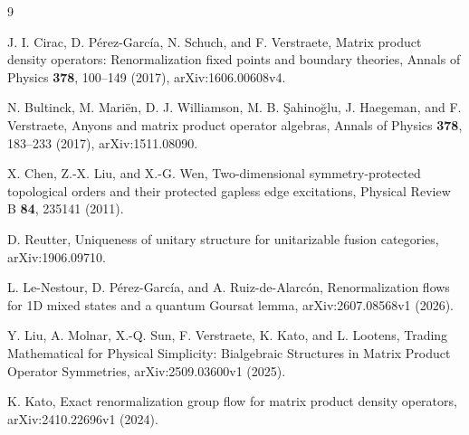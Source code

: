 \begin{thebibliography}{9}

	J. I. Cirac, D. P\'erez-Garc\'ia, N. Schuch, and F. Verstraete,
	Matrix product density operators: Renormalization fixed points and
	boundary theories,
	Annals of Physics \textbf{378}, 100--149 (2017),
	arXiv:1606.00608v4.

	N. Bultinck, M. Mari\"en, D. J. Williamson, M. B. \c{S}ahino\u{g}lu,
	J. Haegeman, and F. Verstraete,
	Anyons and matrix product operator algebras,
	Annals of Physics \textbf{378}, 183--233 (2017),
	arXiv:1511.08090.

	X. Chen, Z.-X. Liu, and X.-G. Wen,
	Two-dimensional symmetry-protected topological orders and their
	protected gapless edge excitations,
	Physical Review B \textbf{84}, 235141 (2011).

	D. Reutter,
	Uniqueness of unitary structure for unitarizable fusion categories,
	arXiv:1906.09710.

L. Le-Nestour, D. P\'erez-Garc\'ia, and A. Ruiz-de-Alarc\'on,
Renormalization flows for 1D mixed states and a quantum Goursat lemma,
arXiv:2607.08568v1 (2026).

Y. Liu, A. Molnar, X.-Q. Sun, F. Verstraete, K. Kato, and L. Lootens,
Trading Mathematical for Physical Simplicity: Bialgebraic Structures in
Matrix Product Operator Symmetries, arXiv:2509.03600v1 (2025).

K. Kato, Exact renormalization group flow for matrix product density
operators, arXiv:2410.22696v1 (2024).

\end{thebibliography}
